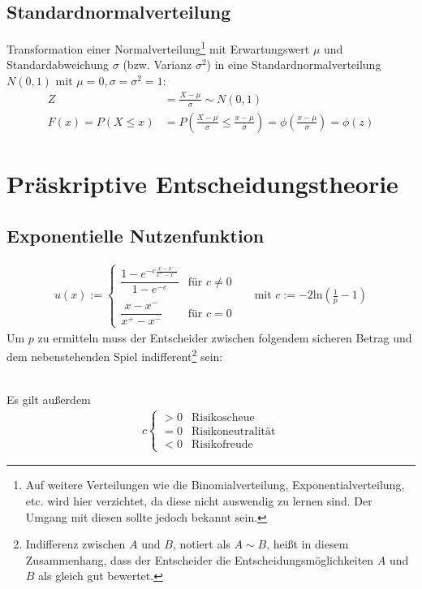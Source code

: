 \documentclass{panikzettel}
\begin{document}
\subsection{Standardnormalverteilung}
Transformation einer Normalverteilung\footnote{Auf weitere Verteilungen wie die Binomialverteilung, Exponentialverteilung, etc. wird hier verzichtet, da diese nicht auswendig zu lernen sind. Der Umgang mit diesen sollte jedoch bekannt sein.} mit Erwartungswert $ \mu $ und Standardabweichung $ \sigma $ (bzw. Varianz $ \sigma^2 $) in eine Standardnormalverteilung $ N(0,1) $ mit $ \mu = 0, \sigma = \sigma^2 = 1 $:
\begin{align*}
	Z &= \frac{X - \mu}{\sigma} \sim N(0,1)\\
	F(x) = P(X \leq x) &= P\left(\frac{X-\mu}{\sigma} \leq \frac{x-\mu}{\sigma}\right) = \phi \left(\frac{x-\mu}{\sigma}\right) = \phi(z)
\end{align*}

\newpage
\section{Präskriptive Entscheidungstheorie}

\subsection{Exponentielle Nutzenfunktion}
\begin{align*}
	u(x) := \begin{cases}
	\dfrac{1 - e ^{-c\frac{x-x^-}{x^+-x^-}}}{1-e^{-c}} & \text{für } c \neq 0\\\\
	\dfrac{x-x^-}{x^+-x^-} & \text{für } c = 0
	\end{cases} && \text{mit } c := -2\text{ln}\left(\frac{1}{p}-1\right)
\end{align*}
Um $ p $ zu ermitteln muss der Entscheider zwischen folgendem sicheren Betrag und dem nebenstehenden Spiel indifferent\footnote{Indifferenz zwischen $A$ und $B$, notiert als $A\sim B$, heißt in diesem Zusammenhang, dass der Entscheider die Entscheidungsmöglichkeiten $A$ und $B$ als gleich gut bewertet.} sein:
\begin{figure}[h]
	\centering
\end{figure}\\
Es gilt außerdem
\begin{align*}
c\left\lbrace \begin{array}{cl}
>0 & \text{Risikoscheue}\\
=0 & \text{Risikoneutralität}\\
<0 & \text{Risikofreude}
\end{array}\right.
\end{align*}
\end{document}
